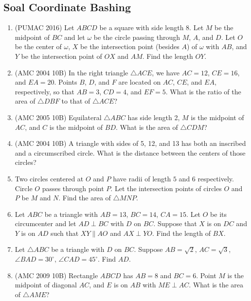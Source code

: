 \documentclass[12pt]{scrartcl}
\begin{document}
\subsection{Soal Coordinate Bashing}
\begin{enumerate}[resume]
    \item (PUMAC 2016) Let $ABCD$ be a square with side length 8. Let $M$ be the midpoint of $BC$ and let $\omega$ be the circle passing through $M$, $A$, and $D$. Let $O$ be the center of $\omega$, $X$ be the intersection point (besides $A$) of $\omega$ with $AB$, and $Y$ be the intersection point of $OX$ and $AM$. Find the length $OY$.

    \item (AMC 2004 10B) In the right triangle $\triangle ACE$, we have $AC = 12$, $CE = 16$, and $EA = 20$. Points $B$, $D$, and $F$ are located on $AC$, $CE$, and $EA$, respectively, so that $AB = 3$, $CD = 4$, and $EF = 5$. What is the ratio of the area of $\triangle DBF$ to that of $\triangle ACE$?

    \item (AMC 2005 10B) Equilateral $\triangle ABC$ has side length 2, $M$ is the midpoint of $AC$, and $C$ is the midpoint of $BD$. What is the area of $\triangle CDM$?

    \item (AMC 2004 10B) A triangle with sides of 5, 12, and 13 has both an inscribed and a circumscribed circle. What is the distance between the centers of those circles?

    \item Two circles centered at $O$ and $P$ have radii of length $5$ and $6$ respectively. Circle $O$ passes through point $P$. Let the intersection points of circles $O$ and $P$ be $M$ and $N$. Find the area of $\triangle MNP$.

    \item Let $ABC$ be a triangle with $AB = 13$, $BC = 14$, $CA = 15$. Let $O$ be its circumcenter and let $AD \perp BC$ with $D$ on $BC$. Suppose that $X$ is on $DC$ and $Y$ is on $AD$ such that $XY \parallel AO$ and $AX \perp YO$. Find the length of $BX$.

    \item Let $\triangle ABC$ be a triangle with $D$ on $BC$. Suppose $AB = \sqrt{2}$, $AC = \sqrt{3}$, $\angle BAD = 30^\circ$, $\angle CAD = 45^\circ$. Find $AD$.

    \item (AMC 2009 10B) Rectangle $ABCD$ has $AB = 8$ and $BC = 6$. Point $M$ is the midpoint of diagonal $AC$, and $E$ is on $AB$ with $ME \perp AC$. What is the area of $\triangle AME$?



\end{enumerate}
\end{document}
